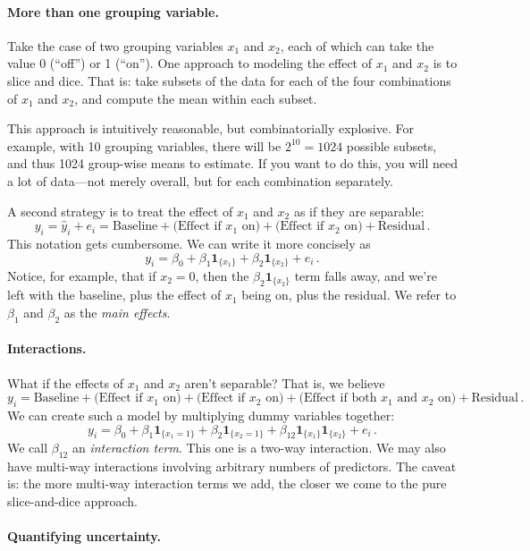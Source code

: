 \documentclass[11pt]{article}
\newcommand{\1}[1]{\mathbf{1}_{\{ {#1} \}}}
\begin{document}
\paragraph{More than one grouping variable.}  Take the case of two grouping variables $x_1$ and $x_2$, each of which can take the value $0$ (``off'') or 1 (``on'').  One approach to modeling the effect of $x_1$ and $x_2$ is to slice and dice.  That is: take subsets of the data for each of the four combinations of $x_1$ and $x_2$, and compute the mean within each subset.

This approach is intuitively reasonable, but combinatorially explosive.  For example, with 10 grouping variables, there will be $2^{10} = 1024$ possible subsets, and thus 1024 group-wise means to estimate.  If you want to do this, you will need a lot of data---not merely overall, but for each combination separately.

A second strategy is to treat the effect of $x_1$ and $x_2$ as if they are separable:
$$
y_i = \hat{y}_i + e_i = \mbox{Baseline} + \mbox{(Effect if $x_1$ on)} +  \mbox{(Effect if $x_2$ on)} +  \mbox{Residual} \, .
$$
This notation gets cumbersome.  We can write it more concisely as
$$
y_i = \beta_0 + \beta_1 \1{x_1} + \beta_2 \1{x_2} + e_i \, .
$$
Notice, for example, that if $x_2=0$, then the $\beta_2 \1{x_2}$ term falls away, and we're left with the baseline, plus the effect of $x_1$ being on, plus the residual.  We refer to $\beta_1$ and $\beta_2$ as the \textit{main effects}.

\paragraph{Interactions.}

What if the effects of $x_1$ and $x_2$ aren't separable?  That is, we believe
$$
y_i = \mbox{Baseline} + \mbox{(Effect if $x_1$ on)} +  \mbox{(Effect if $x_2$ on)} + \mbox{(Effect if both $x_1$ and $x_2$ on)} +  \mbox{Residual} \, .
$$
We can create such a model by multiplying dummy variables together:
$$
y_i = \beta_0 + \beta_1 \1{x_1=1} + \beta_2 \1{x_2=1}+ \beta_{12} \1{x_1} \1{x_2} + e_i \, .
$$
We call $\beta_{12}$ an \textit{interaction term}.  This one is a two-way interaction.  We may also have multi-way interactions involving arbitrary numbers of predictors.  The caveat is: the more multi-way interaction terms we add, the closer we come to the pure slice-and-dice approach.


\paragraph{Quantifying uncertainty.}
\end{document}
